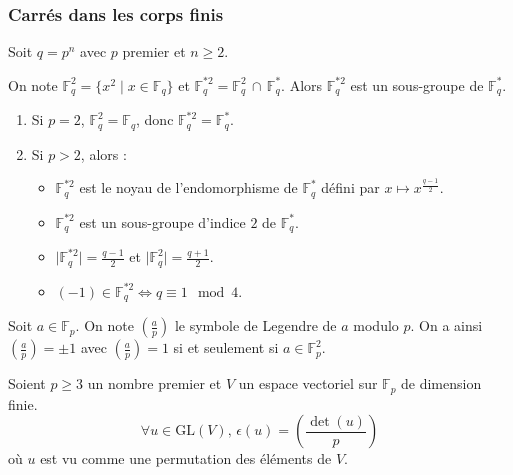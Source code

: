   \subsubsection{Carrés dans les corps finis}


  Soit $q = p^n$ avec $p$ premier et $n \geq 2$.

  \begin{proposition}
    On note $\mathbb{F}_q^2 = \{ x^2 \mid x \in \mathbb{F}_q \}$ et $\mathbb{F}_q^{*2} = \mathbb{F}_q^2 \, \cap \, \mathbb{F}_q^*$. Alors $\mathbb{F}_q^{*2}$ est un sous-groupe de $\mathbb{F}_q^*$.
  \end{proposition}

  \begin{proposition}
    \begin{enumerate}[label={\bfseries(\roman*)}]
      \item Si $p = 2$, $\mathbb{F}_q^2 = \mathbb{F}_q$, donc $\mathbb{F}_q^{*2} = \mathbb{F}_q^*$.
      \item Si $p > 2$, alors :
      \begin{itemize}
        \item $\mathbb{F}_q^{*2}$ est le noyau de l'endomorphisme de $\mathbb{F}_q^*$ défini par $x \mapsto x^{\frac{q-1}{2}}$.
        \item $\mathbb{F}_q^{*2}$ est un sous-groupe d'indice $2$ de $\mathbb{F}_q^*$.
        \item $\vert \mathbb{F}_q^{*2} \vert = \frac{q-1}{2}$ et $\vert \mathbb{F}_q^2 \vert = \frac{q+1}{2}$.
        \item $(-1) \in \mathbb{F}_q^{*2} \iff q \equiv 1 \mod 4$.
      \end{itemize}
    \end{enumerate}
  \end{proposition}


  \begin{notation}
    Soit $a \in \mathbb{F}_p$. On note $\left( \frac{a}{p} \right)$ le symbole de Legendre de $a$ modulo $p$. On a ainsi $\left( \frac{a}{p} \right) = \pm 1$ avec $\left( \frac{a}{p} \right) = 1$ si et seulement si $a \in \mathbb{F}_p^2$.
  \end{notation}

  \begin{application}
    Soient $p \geq 3$ un nombre premier et $V$ un espace vectoriel sur $\mathbb{F}_p$ de dimension finie.
    \[ \forall u \in \mathrm{GL}(V), \, \epsilon(u) = \left( \frac{\det(u)}{p} \right) \]
    où $u$ est vu comme une permutation des éléments de $V$.
  \end{application}

